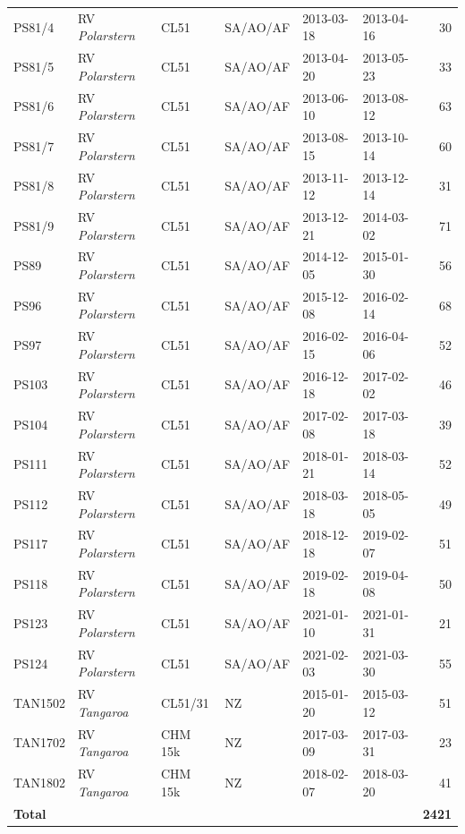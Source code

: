 \documentclass[draft]{agujournal2019}
\begin{document}
\begin{table}[p!]
\begin{tabular}{llllllr}
PS81/4   & RV \emph{Polarstern}          & CL51    & SA/AO/AF & 2013-03-18 & 2013-04-16 & 30 \\
PS81/5   & RV \emph{Polarstern}          & CL51    & SA/AO/AF & 2013-04-20 & 2013-05-23 & 33 \\
PS81/6   & RV \emph{Polarstern}          & CL51    & SA/AO/AF & 2013-06-10 & 2013-08-12 & 63 \\
PS81/7   & RV \emph{Polarstern}          & CL51    & SA/AO/AF & 2013-08-15 & 2013-10-14 & 60 \\
PS81/8   & RV \emph{Polarstern}          & CL51    & SA/AO/AF & 2013-11-12 & 2013-12-14 & 31 \\
PS81/9   & RV \emph{Polarstern}          & CL51    & SA/AO/AF & 2013-12-21 & 2014-03-02 & 71 \\
PS89     & RV \emph{Polarstern}          & CL51    & SA/AO/AF & 2014-12-05 & 2015-01-30 & 56 \\
PS96     & RV \emph{Polarstern}          & CL51    & SA/AO/AF & 2015-12-08 & 2016-02-14 & 68 \\
PS97     & RV \emph{Polarstern}          & CL51    & SA/AO/AF & 2016-02-15 & 2016-04-06 & 52 \\
PS103    & RV \emph{Polarstern}          & CL51    & SA/AO/AF & 2016-12-18 & 2017-02-02 & 46 \\
PS104    & RV \emph{Polarstern}          & CL51    & SA/AO/AF & 2017-02-08 & 2017-03-18 & 39 \\
PS111    & RV \emph{Polarstern}          & CL51    & SA/AO/AF & 2018-01-21 & 2018-03-14 & 52 \\
PS112    & RV \emph{Polarstern}          & CL51    & SA/AO/AF & 2018-03-18 & 2018-05-05 & 49 \\
PS117    & RV \emph{Polarstern}          & CL51    & SA/AO/AF & 2018-12-18 & 2019-02-07 & 51 \\
PS118    & RV \emph{Polarstern}          & CL51    & SA/AO/AF & 2019-02-18 & 2019-04-08 & 50 \\
PS123    & RV \emph{Polarstern}          & CL51    & SA/AO/AF & 2021-01-10 & 2021-01-31 & 21 \\
PS124    & RV \emph{Polarstern}          & CL51    & SA/AO/AF & 2021-02-03 & 2021-03-30 & 55 \\
TAN1502  & RV \emph{Tangaroa}            & CL51/31 & NZ       & 2015-01-20 & 2015-03-12 & 51 \\
TAN1702  & RV \emph{Tangaroa}            & CHM 15k & NZ       & 2017-03-09 & 2017-03-31 & 23 \\
TAN1802  & RV \emph{Tangaroa}            & CHM 15k & NZ       & 2018-02-07 & 2018-03-20 & 41 \\
\hline
\textbf{Total} &                         &         &          &            &            & \textbf{2421}\\
\hline
\end{tabular}
\normalsize
\end{table}
\end{document}
